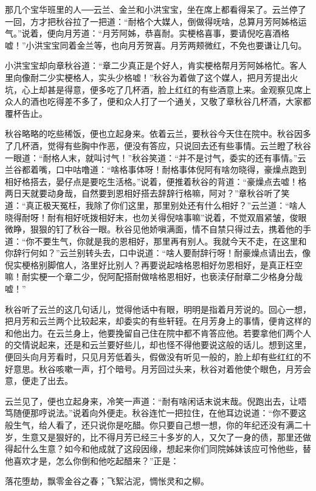 \documentclass[12pt,UTF8]{ctexbook}
\begin{document}
{{{那几个宝华班里的人──云兰、金兰和小洪宝宝，坐在席上都看得呆了。云兰停了一回，方才把秋谷拉了一把道：“耐格个大媒人，倒做得呒啥，总算月芳阿姊格运气。”说着，便向月芳道：“月芳阿姊，恭喜耐。实梗格喜事，要请倪吃喜酒格嘘！”小洪宝宝同着金兰等，也向月芳贺喜。月芳两颊微红，不免也要谦让几句。

小洪宝宝却向章秋谷道：“章二少真正是个好人，肯实梗格帮月芳阿姊格忙。客人里向像耐二少实梗格人，实头少格嘘！”秋谷为着做了这个媒人，把月芳提出火坑，心上却甚是得意，便多吃了几杯酒，脸上红红的有些酒意上来。金观察见席上众人的酒也吃得差不多了，便和众人打了一个通关，又敬了章秋谷几杯酒，大家都覆杯告止。

秋谷略略的吃些稀饭，便也立起身来。依着云兰，要秋谷今天住在院中。秋谷因多了几杯酒，觉得有些胸中作恶，便没有答应，只说回去还有些事情。云兰瞪了秋谷一眼道：“耐格人末，就叫讨气！”秋谷笑道：“并不是讨气，委实的还有事情。”云兰谷都着嘴，口中咕噜道：“啥格事体呀！耐格事体倪阿有啥勿晓得，豪燥点跑到相好格搭去，晏仔点是要吃生活格。”说着，便推着秋谷的背道：“豪燥点去嘘！格两日天就要动身哉，自然要到恩相好搭去辞辞行格嘛，阿对？”章秋谷听了笑道：“真正极天冤枉，我除了你们这里，那里别处还有什么相好？”云兰道：“啥人晓得耐呀！耐有相好呒拨相好末，也勿关得倪啥事嘛”说着，不觉双眉紧皱，俊眼微睁，狠狠的钉了秋谷一眼。秋谷见他娇嗔满面，情不自禁只得过去，携着他的手道：“你不要生气，你就是我的恩相好，那里再有别人。我就今天不走，在这里和你辞行何如？”云兰别转头去，口中说道：“啥人要耐辞行呀！耐豪燥点请出去，像倪实梗格别脚倌人，洛里好比别人？再要说起啥格恩相好勿恩相好，是真正枉空嘛！耐实梗一个章二少，倪阿配搭耐做啥格恩相好，也亵渎仔耐章二少格身分哉嘘！”

秋谷听了云兰的这几句话儿，觉得他话中有眼，明明是指着月芳说的。回心一想，把月芳和云兰两个比较起来，却委实的有些轩轾。在月芳身上的事情，便肯这样的和他出力。在云兰身上，他要挽留自己住在院中都不肯答应他。若要拿他们两个人的交情说起来，还是和云兰要好些儿，却也怪不得他要说这般的话儿。想到这里，便回头向月芳看时，只见月芳低着头，假做没有听见一般的，脸上却有些红红的不好意思。秋谷咳嗽一声，打个暗号。月芳回过头来，秋谷对着他使个眼色，月芳会意，便走了出去。

云兰见了，便也立起身来，冷笑一声道：“耐有啥闲话末说末哉。倪跑出去，让唔笃随便那哼说法。”说着向外便走。秋谷连忙一把拉住，在他耳边说道：“你不要这般生气，给人看了，还只说你是吃醋。你只要自己想一想，你的年纪还没有满二十岁，生意又是狠好的，比不得月芳已经三十多岁的人，又欠了一身的债，那里还做得起什么生意？如今和他成就了这段因缘，想起来你们同院姊妹该应可怜他些，替他喜欢才是，怎么你倒和他吃起醋来？”正是：

落花堕劫，飘零金谷之春；飞絮沾泥，惆怅灵和之柳。

}}}
\end{document}
